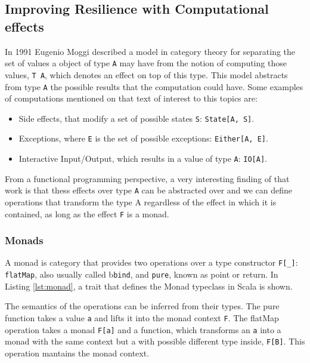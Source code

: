 \documentclass[../main.tex]{subfiles}
\begin{document}
\subsection{Improving Resilience with Computational effects}
In 1991 Eugenio Moggi \autocite{MoggiNotionsMonads} described a model
in category theory for separating the set of values a object of type \texttt{A} may have from
the notion of computing those values, \texttt{T A}, which denotes an effect on top of
this type. This model abstracts from type \texttt{A} the possible
results that the computation could have. Some examples of computations mentioned
on that text of interest to this topics are:

\begin{itemize}
\item Side effects, that modify a set of possible states \texttt{S}: \texttt{State[A, S]}.
\item Exceptions, where \texttt{E} is the set of possible exceptions: \texttt{Either[A, E]}.
\item Interactive Input/Output, which results in a value of type \texttt{A}: \texttt{IO[A]}.
\end{itemize}

From a functional programming perspective, a very interesting finding of that
work is that thess effects over type \texttt{A} can be abstracted over and we can define
operations that transform the type A regardless of the effect in which it is
contained, as long as the effect \texttt{F} is a monad. %

\subsubsection{Monads}
A monad is category that provides two operations over a type constructor
\texttt{F[\_]}: \texttt{flatMap}, also usually called b\texttt{bind}, and \texttt{pure},
known as point or return. In Listing \ref{lst:monad}, a trait that defines the
Monad typeclass in Scala is shown.



The semantics of the operations can be inferred from their types.
The pure function takes a value \texttt{a} and lifts it into the monad context
\texttt{F}. The flatMap operation takes a monad \texttt{F[a]} and a function,
which transforms an \texttt{a} into a monad with the same context but a with possible
different type inside, \texttt{F[B]}. This operation mantains the monad context.
\end{document}
